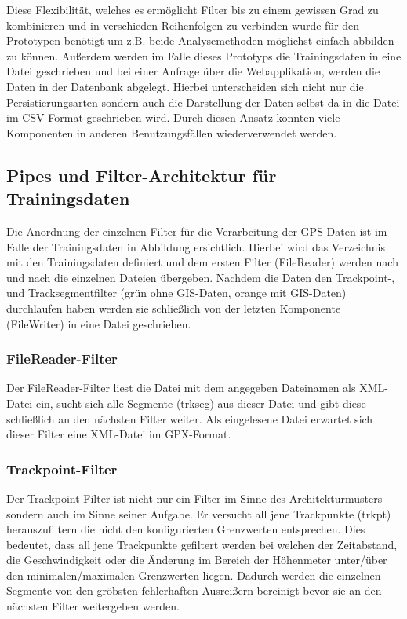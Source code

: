 Diese Flexibilität, welches es ermöglicht Filter bis zu einem gewissen Grad zu kombinieren und in verschieden Reihenfolgen zu verbinden wurde für den Prototypen benötigt um z.B. beide Analysemethoden möglichst einfach abbilden zu können. Außerdem werden im Falle dieses Prototyps die Trainingsdaten in eine Datei geschrieben und bei einer Anfrage über die Webapplikation, werden die Daten in der Datenbank abgelegt. Hierbei unterscheiden sich nicht nur die Persistierungsarten sondern auch die Darstellung der Daten selbst da in die Datei im CSV-Format geschrieben wird. Durch diesen Ansatz konnten viele Komponenten in anderen Benutzungsfällen wiederverwendet werden.

\subsection{Pipes und Filter-Architektur für Trainingsdaten}
Die Anordnung der einzelnen Filter für die Verarbeitung der GPS-Daten ist im Falle der Trainingsdaten in Abbildung  ersichtlich. Hierbei wird das Verzeichnis mit den Trainingsdaten definiert und dem ersten Filter (FileReader) werden nach und nach die einzelnen Dateien übergeben. Nachdem die Daten den Trackpoint-, und Tracksegmentfilter (grün ohne GIS-Daten, orange mit GIS-Daten) durchlaufen haben werden sie schließlich von der letzten Komponente (FileWriter) in eine Datei geschrieben.


\subsubsection{FileReader-Filter}
Der FileReader-Filter liest die Datei mit dem angegeben Dateinamen als XML-Datei ein, sucht sich alle Segmente (trkseg) aus dieser Datei und gibt diese schließlich an den nächsten Filter weiter. Als eingelesene Datei erwartet sich dieser Filter eine XML-Datei im GPX-Format.

\subsubsection{Trackpoint-Filter}
Der Trackpoint-Filter ist nicht nur ein Filter im Sinne des Architekturmusters sondern auch im Sinne seiner Aufgabe. Er versucht all jene Trackpunkte (trkpt) herauszufiltern die nicht den konfigurierten Grenzwerten entsprechen. Dies bedeutet, dass all jene Trackpunkte gefiltert werden bei welchen der Zeitabstand, die Geschwindigkeit oder die Änderung im Bereich der Höhenmeter unter/über den minimalen/maximalen Grenzwerten liegen. Dadurch werden die einzelnen Segmente von den gröbsten fehlerhaften Ausreißern bereinigt bevor sie an den nächsten Filter weitergeben werden.

